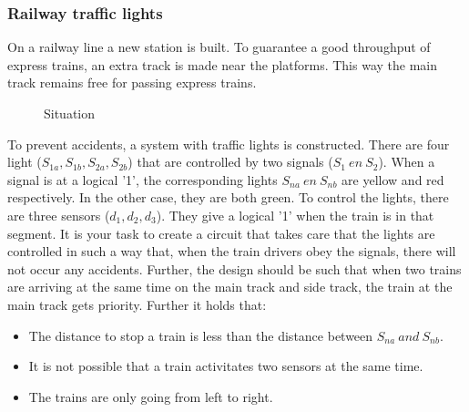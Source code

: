 
\setcounter{secnumdepth}{0}

\subsubsection{Railway traffic lights}
On a railway line a new station is built.
To guarantee a good throughput of express trains,
an extra track is made near the platforms.
This way the main track remains free for passing
express trains.

\begin{figure}[bth]
\centerline{}
\caption{Situation}
\end{figure}

To prevent accidents, a system with traffic lights is constructed.
There are four light ($S_{1a}, S_{1b}, S_{2a}, S_{2b}$)
that are controlled by two signals
($S_{1}\ en\ S_{2}$). 
When a signal is at a logical '1', the 
corresponding lights $S_{na}\ en\ S_{nb}$
are yellow and red respectively.
In the other case, they are both green.
To control the lights, there are three sensors
($d_{1},d_{2},d_{3}$).
They give a logical '1' when the train is in that segment.
It is your task to create a circuit that takes care that the lights are
controlled in such a way that, when the train drivers obey the signals,
there will not occur any accidents.
Further, the design should be such that when two trains are arriving
at the same time on the main track and side track, the train at the main 
track gets priority.
Further it holds that:
\begin{itemize}
\item
The distance to stop a train is less than the distance
between $S_{na}\ and\ S_{nb}$.
\item
It is not possible that a train activitates two sensors at the same time.
\item
The trains are only going from left to right.
\end{itemize}

